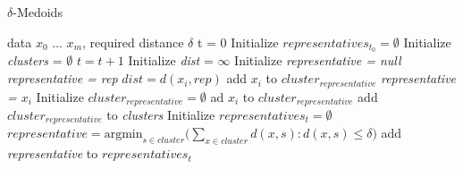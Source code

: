 \documentclass[thesis=B,english]{FITthesis}[2012/10/20]
\begin{document}
\begin{algorithm}                                                                 
    \caption{$\delta$-Medoids}                                                    
    \label{delta_medoids_full}                                                    
    \begin{algorithmic}[1]                                                        
        \INPUT data $x_0$ ... $x_m$, required distance $\delta$                   
        \STATE t = 0                                                              
        \STATE Initialize $representatives_{t_0} = \emptyset$                     
        \STATE Initialize \textit{clusters} = $\emptyset$                         
        \DO                                                                       
            \STATE $t = t + 1$                                                    
                \STATE Initialize \textit{dist} = $\infty$                        
                \STATE Initialize \textit{representative = null}                  
                        \STATE \textit{representative = rep}                      
                        \STATE $dist = d(x_i, rep)$                               
                    \ENDIF                                                        
                \ENDFOR                                                           
                    \STATE add $x_i$ to $cluster_{representative}$                
                \ELSE                                                             
                    \STATE \textit{representative = $x_i$}                        
                    \STATE Initialize $cluster_{representative} = \emptyset$      
                    \STATE ad $x_i$ to $cluster_{representative}$                 
                    \STATE add $cluster_{representative}$ to \textit{clusters}    
                \ENDIF                                                            
            \ENDFOR                                                               
            \STATE Initialize $representatives_t = \emptyset$                     
                \STATE $representative = \textrm{argmin}_{s \in cluster} (\sum\limits_{x \in cluster}{d(x,s) : d(x,s) \le \delta)}$
                \STATE add \textit{representative} to $representatives_t$         
            \ENDFOR                                                               
    \end{algorithmic}                                                             
\end{algorithm}             
\end{document}
